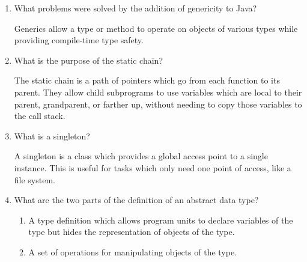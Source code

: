 \begin{enumerate}
\begin{answer}
  \end{answer}

  \item What problems were solved by the addition
    of genericity to Java?

  \begin{answer}

    Generics allow a type or method to operate on objects
    of various types while providing compile-time type
    safety.

  \end{answer}

  \item What is the purpose of the static chain?

  \begin{answer}

    The static chain is a path of pointers which go
    from each function to its parent. They allow
    child subprograms to use variables which are
    local to their parent, grandparent, or farther
    up, without needing to copy those variables to
    the call stack.

  \end{answer}

  \item What is a singleton?

  \begin{answer}

    A singleton is a class which provides a global
    access point to a single instance. This is useful
    for tasks which only need one point of access,
    like a file system.

  \end{answer}

  \item What are the two parts of the definition 
    of an abstract data type?

  \begin{answer}

    \begin{enumerate}
      \item A type definition which allows program units
      to declare variables of the type but hides the
      representation of objects of the type.
      \item A set of operations for manipulating objects
      of the type.
    \end{enumerate}

  \end{answer}
\end{enumerate}